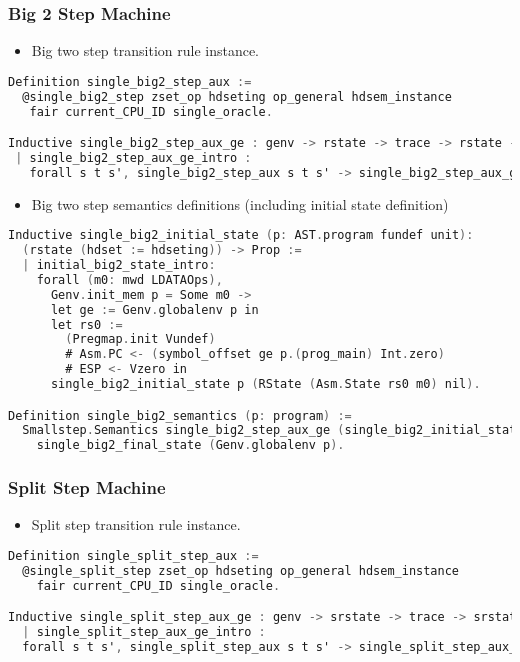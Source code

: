 \subsubsection{Big 2 Step Machine}
\begin{itemize}[leftmargin=*]
\item Big two step transition rule instance.
\end{itemize}
\begin{lstlisting}[language=C]
Definition single_big2_step_aux :=
  @single_big2_step zset_op hdseting op_general hdsem_instance 
   fair current_CPU_ID single_oracle.

Inductive single_big2_step_aux_ge : genv -> rstate -> trace -> rstate -> Prop :=
 | single_big2_step_aux_ge_intro : 
   forall s t s', single_big2_step_aux s t s' -> single_big2_step_aux_ge ge s t s'.
\end{lstlisting}


\begin{itemize}[leftmargin=*]
\item Big two step semantics definitions (including initial state definition)
\end{itemize}
\begin{lstlisting}[language=C]
Inductive single_big2_initial_state (p: AST.program fundef unit): 
  (rstate (hdset := hdseting)) -> Prop :=
  | initial_big2_state_intro: 
    forall (m0: mwd LDATAOps),
      Genv.init_mem p = Some m0 ->
      let ge := Genv.globalenv p in
      let rs0 :=
        (Pregmap.init Vundef)
        # Asm.PC <- (symbol_offset ge p.(prog_main) Int.zero)
        # ESP <- Vzero in
      single_big2_initial_state p (RState (Asm.State rs0 m0) nil).

Definition single_big2_semantics (p: program) :=
  Smallstep.Semantics single_big2_step_aux_ge (single_big2_initial_state p) 
    single_big2_final_state (Genv.globalenv p).
\end{lstlisting}

\subsubsection{Split Step Machine}
\begin{itemize}[leftmargin=*]
\item Split step transition rule instance.
\end{itemize}
\begin{lstlisting}[language=C]
Definition single_split_step_aux :=
  @single_split_step zset_op hdseting op_general hdsem_instance 
    fair current_CPU_ID single_oracle.

Inductive single_split_step_aux_ge : genv -> srstate -> trace -> srstate -> Prop :=
  | single_split_step_aux_ge_intro : 
  forall s t s', single_split_step_aux s t s' -> single_split_step_aux_ge ge s t s'.
\end{lstlisting}


